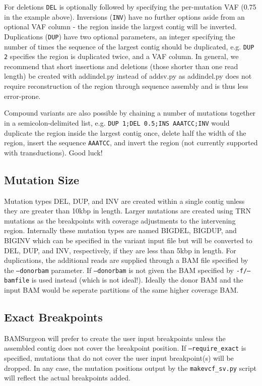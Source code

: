 \documentclass[letterpaper,11pt]{article}
\begin{document}
    For deletions  \texttt{DEL} is optionally followed by specifying the per-mutation VAF (0.75 in the example above). Inversions (\texttt{INV}) have no further options aside from an optional VAF column - the region inside the largest contig will be inverted. Duplications (\texttt{DUP}) have two optional parameters, an integer specifying the number of times the sequence of the largest contig should be duplicated, e.g. \texttt{DUP 2} specifies the region is duplicated twice, and a VAF column. In general, we recommend that short insertions and deletions (those shorter than one read length) be created with addindel.py instead of addsv.py as addindel.py does not require reconstruction of the region through sequence assembly and is thus less error-prone.

    Compound variants are also possible by chaining a number of mutations together in a semicolon-delimited list, e.g. \texttt{DUP 1;DEL 0.5;INS AAATCC;INV} would duplicate the region inside the largest contig once, delete half the width of the region, insert the sequence \texttt{AAATCC}, and invert the region (not currently supported with transductions). Good luck!

\subsection{Mutation Size}
Mutation types DEL, DUP, and INV are created within a single contig unless they are greater than 10kbp in length. Larger mutations are created using TRN mutations as the breakpoints with coverage adjustments to the intervening region. Internally these mutation types are named BIGDEL, BIGDUP, and BIGINV which can be specified in the variant input file but will be converted to DEL, DUP, and INV, respectively, if they are less than 5kbp in length. For duplications, the additional reads are supplied through a BAM file specified by the \texttt{--donorbam} parameter. If \texttt{--donorbam} is not given the BAM specified by \texttt{-f/--bamfile} is used instead (which is not ideal!). Ideally the donor BAM and the input BAM would be seperate partitions of the same higher coverage BAM.

\subsection{Exact Breakpoints}
BAMSurgeon will prefer to create the user input breakpoints unless the assembled contig does not cover the breakpoint position. If \texttt{--require\_exact} is specified, mutations that do not cover the user input breakpoint(s) will be dropped. In any case, the mutation positions output by the \texttt{makevcf\_sv.py} script will reflect the actual breakpoints added.
\end{document}
